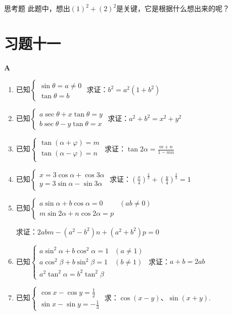 \begin{thm}{思考题}
    此题中，想出$(1)^2+(2)^2$是关键，它是根据什么想出来的呢？
\end{thm}

\section*{习题十一}
\begin{center}
    \bfseries A
\end{center}

\begin{enumerate}
    \item 已知$\begin{cases}
        \sin\theta=a\ne 0\\ \tan\theta=b
    \end{cases}$ 求证：$b^2=a^2(1+b^2)$
    \item 已知$\begin{cases}
        a\sec\theta+x\tan\theta=y\\ b\sec\theta-y\tan\theta=x
    \end{cases}$ 求证：$a^2+b^2=x^2+y^2$
    \item 已知$\begin{cases}
        \tan(\alpha+\varphi)=m\\
        \tan(\alpha-\varphi)=n\\
    \end{cases}$ 求证：$\tan 2\alpha=\frac{m+n}{1-mn}$
    \item 已知$\begin{cases}
        x=3\cos\alpha+\cos3\alpha \\ y=3\sin\alpha-\sin3\alpha
    \end{cases}$ 求证：$\left(\frac{x}{4}\right)^{\tfrac{2}{3}}+\left(\frac{y}{4}\right)^{\tfrac{2}{3}}=1$
    \item 已知$\begin{cases}
        a\sin\alpha+b\cos\alpha=0& (ab\ne 0)\\
        m\sin2\alpha+n\cos2\alpha=p
    \end{cases}$
    
    求证：$2abm-(a^2-b^2)n+(a^2+b^2)p=0$
    \item 已知$\begin{cases}
        a\sin^2\alpha +b\cos^2\alpha=1&(a\ne 1)\\
        a\cos^2\beta+b\sin^2\beta=1&(b\ne 1)\\
        a^2\tan^2\alpha=b^2\tan^2\beta
    \end{cases}$ 求证：$a+b=2ab$
    \item 已知$\begin{cases}
        \cos x-\cos y=\frac{1}{2}\\ 
        \sin x-\sin y=-\frac{1}{3}
    \end{cases}$ 求：$\cos(x-y)$、$\sin(x+y)$.
\end{enumerate}


